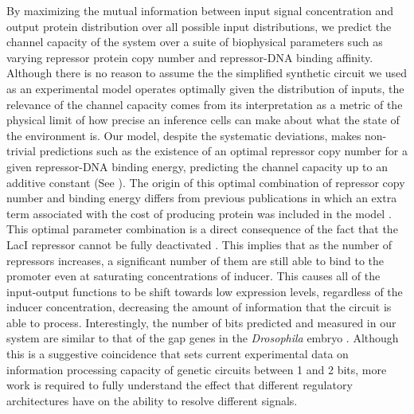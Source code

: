 By maximizing the mutual information between input signal concentration and
output protein distribution over all possible input distributions, we predict
the channel capacity of the system over a suite of biophysical parameters such
as varying repressor protein copy number and repressor-DNA binding affinity.
Although there is no reason to assume the the simplified synthetic circuit we
used as an experimental model operates optimally given the distribution of
inputs, the relevance of the channel capacity comes from its interpretation as a
metric of the physical limit of how precise an inference cells can make about
what the state of the environment is. Our model, despite the systematic
deviations, makes non-trivial predictions such as the existence of an optimal
repressor copy number for a given repressor-DNA binding energy, predicting the
channel capacity up to an additive constant (See ). The
origin of this optimal combination of repressor copy number and binding energy
differs from previous publications in which an extra term associated with the
cost of producing protein was included in the model \cite{Tkacik2011}. This
optimal parameter combination is a direct consequence of the fact that the LacI
repressor cannot be fully deactivated \cite{Razo-Mejia2018}. This implies that
as the number of repressors increases, a significant number of them are still
able to bind to the promoter even at saturating concentrations of inducer. This
causes all of the input-output functions to be shift towards low expression
levels, regardless of the inducer concentration, decreasing the amount of
information that the circuit is able to process. Interestingly, the number of
bits predicted and measured in our system are similar to that of the gap genes
in the \textit{Drosophila} embryo \cite{Dubuis2013}. Although this is a
suggestive coincidence that sets current experimental data on information 
processing capacity of genetic circuits between 1 and 2 bits, more work is 
required to fully understand the effect that different regulatory architectures
have on the ability to resolve different signals.

